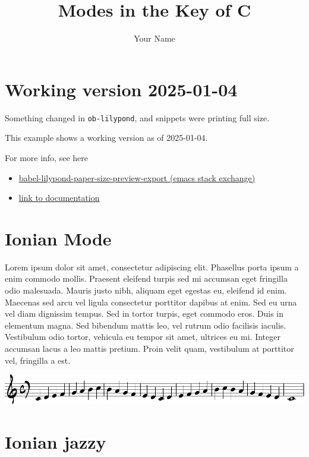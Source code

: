\documentclass[11pt]{article}
\author{Your Name}
\date{}
\title{Modes in the Key of C}
\let\maketitle\relax %
\begin{document}
\maketitle

\section*{Working version 2025-01-04}
\label{sec:org7bebcbe}

Something changed in \texttt{ob-lilypond}, and snippets were printing full size.

This example shows a working version as of 2025-01-04.

For more info, see here
\begin{itemize}
\item \href{https://emacs.stackexchange.com/questions/70551/babel-lilypond-paper-size-preview-export}{babel-lilypond-paper-size-preview-export (emacs stack exchange)}
\item \href{https://lilypond.org/doc/v2.24/Documentation/usage/other-programs}{link to documentation}
\end{itemize}

\section*{Ionian Mode}
\label{sec:org1af7d0d}

Lorem ipsum dolor sit amet, consectetur adipiscing elit. Phasellus
porta ipsum a enim commodo mollis. Praesent eleifend turpis sed mi
accumsan eget fringilla odio malesuada. Mauris justo nibh, aliquam
eget egestas eu, eleifend id enim. Maecenas sed arcu vel ligula
consectetur porttitor dapibus at enim. Sed eu urna vel diam dignissim
tempus. Sed in tortor turpis, eget commodo eros. Duis in elementum
magna. Sed bibendum mattis leo, vel rutrum odio facilisis iaculis.
Vestibulum odio tortor, vehicula eu tempor sit amet, ultrices eu mi.
Integer accumsan lacus a leo mattis pretium. Proin velit quam,
vestibulum at porttitor vel, fringilla a est.

\begin{center}
\includegraphics[width=.9\linewidth]{ionian.pdf}
\end{center}

\section*{Ionian jazzy}
\label{sec:org2a1bc4a}
\end{document}
